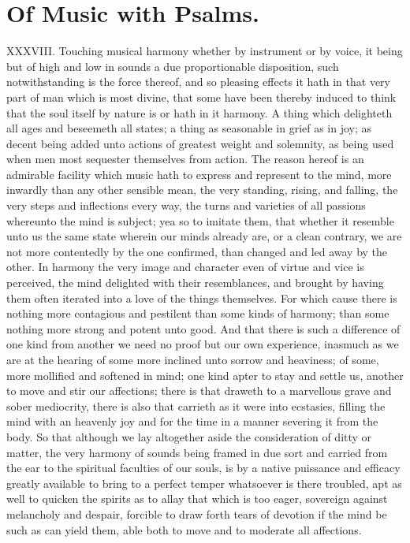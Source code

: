 \section*{Of Music with Psalms.}
XXXVIII. Touching musical harmony whether by instrument or by voice, it being but of high and low in sounds a due proportionable disposition, such notwithstanding is the force thereof, and so pleasing effects it hath in that very part of man which is most divine, that some have been thereby induced to think that the soul itself by nature is or hath in it harmony. A thing which delighteth all ages and beseemeth all states; a thing as seasonable in grief as in joy; as decent being added unto actions of greatest weight and solemnity, as being used when men most sequester themselves from action. The reason hereof is an admirable facility which music hath to express and represent to the mind, more inwardly than any other sensible mean, the very standing, rising, and falling, the  very steps and inflections every way,
 the turns and varieties of all passions whereunto the mind is subject; yea so to imitate them, that whether it resemble unto us the same state wherein our minds already are, or a clean contrary, we are not more contentedly by the one confirmed, than changed and led away by the other. In harmony the very image and character even of virtue and vice is perceived, the mind delighted with their resemblances, and brought by having them often iterated into a love of the things themselves. For which cause there is nothing more contagious and pestilent than some kinds of harmony; than some nothing more strong and potent unto good. And that there is such a difference of one kind from another we need no proof but our own experience, inasmuch as we are at the hearing of some more inclined unto sorrow and heaviness; of some, more mollified and softened in mind; one kind apter to stay and settle us, another to move and stir our affections; there is that draweth to a marvellous grave and sober mediocrity, there is also that carrieth as it were into ecstasies, filling the mind with an heavenly joy and for the time in a manner severing it from the body. So that although we lay altogether aside the consideration of ditty or matter, the very harmony of sounds being framed in due sort and carried from the ear to the spiritual faculties of our souls, is by a native puissance and efficacy greatly available to bring to a perfect temper whatsoever is there troubled, apt as well to quicken the spirits as to allay that which is too eager, sovereign against melancholy and despair, forcible to draw forth tears of devotion if the mind be such as can yield them, able both to move and to moderate all affections.

